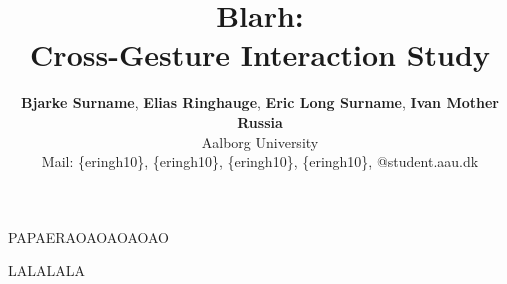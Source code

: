 
\usepackage[backend=biber,style=alphabetic]{biblatex}


\title{Blarh:\\Cross-Gesture Interaction Study}
\author{
\textbf{Bjarke Surname}, 
\textbf{Elias Ringhauge}, 
\textbf{Eric Long Surname}, 
\textbf{Ivan Mother Russia}
\\Aalborg University
\\Mail: 
\{eringh10\},
\{eringh10\},
\{eringh10\},
\{eringh10\},
 @student.aau.dk}

\maketitle


\begin{refsection}[Literaturereview]
   \nocite{*}   %
   \printbibliography[heading=bibnumbered, title={Refferences}]
\end{refsection}





PAPAERAOAOAOAOAO
\begin{refsection}[Paper]
   \nocite{*}   
   \printbibliography[heading=bibnumbered, title={Refferences}]
\end{refsection}

LALALALA
   \nocite{*}   
\printbibliography[heading=bibnumbered, title={aa}]
